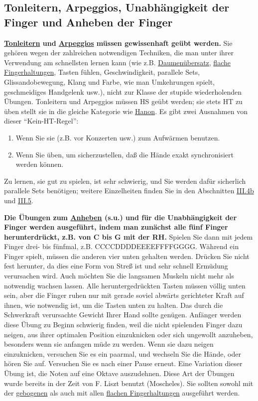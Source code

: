 
\subsection{Tonleitern, Arpeggios, Unabhängigkeit der Finger und Anheben der Finger}\hypertarget{c1iii7d}{}

\textbf{\hyperlink{c1iii5a}{Tonleitern} und \hyperlink{Arpeggios}{Arpeggios} müssen gewissenhaft geübt werden.}
Sie gehören wegen der zahlreichen notwendigen Techniken, die man unter ihrer Verwendung am schnellsten lernen kann (wie z.B. \hyperlink{c1iii5a}{Daumenübersatz}, \hyperlink{c1iii4b}{flache Fingerhaltungen}, Tasten fühlen, Geschwindigkeit, parallele Sets, Glissandobewegung, Klang und Farbe, wie man Umkehrungen spielt, geschmeidiges Handgelenk usw.), nicht zur Klasse der stupide wiederholenden Übungen.
Tonleitern und Arpeggios müssen HS geübt werden; sie stets HT zu üben stellt sie in die gleiche Kategorie wie \hyperlink{c1iii7h}{Hanon}.
Es gibt zwei Ausnahmen von dieser \enquote{Kein-HT-Regel}:

\begin{enumerate} 
 \item Wenn Sie sie (z.B. vor Konzerten usw.) zum Aufwärmen benutzen.
 \item Wenn Sie üben, um sicherzustellen, daß die Hände exakt synchronisiert werden können.
 \end{enumerate}
Zu lernen, sie gut zu spielen, ist sehr schwierig, und Sie werden dafür sicherlich parallele Sets benötigen; weitere Einzelheiten finden Sie in den Abschnitten \hyperlink{c1iii4b}{III.4b} und \hyperlink{c1iii5a}{III.5}.


\hypertarget{c1iii7finger}{}

\textbf{Die Übungen zum \hyperlink{c1iii7anheben}{Anheben} (s.u.) und für die Unabhängigkeit der Finger werden ausgeführt, indem man zunächst alle fünf Finger herunterdrückt, z.B. von C bis G mit der RH.}
Spielen Sie dann mit jedem Finger drei- bis fünfmal, z.B. CCCCDDDDEEEEFFFFGGGG.
Während ein Finger spielt, müssen die anderen vier unten gehalten werden.
Drücken Sie nicht fest herunter, da dies eine Form von Streß ist und sehr schnell Ermüdung verursachen wird.
Auch möchten Sie die langsamen Muskeln nicht mehr als notwendig wachsen lassen.
Alle heruntergedrückten Tasten müssen völlig unten sein, aber die Finger ruhen nur mit gerade soviel abwärts gerichteter Kraft auf ihnen, wie notwendig ist, um die Tasten unten zu halten.
Das durch die Schwerkraft verursachte Gewicht Ihrer Hand sollte genügen.
Anfänger werden diese Übung zu Beginn schwierig finden, weil die nicht spielenden Finger dazu neigen, aus ihrer optimalen Position einzuknicken oder sich ungewollt anzuheben, besonders wenn sie anfangen müde zu werden.
Wenn sie dazu neigen einzuknicken, versuchen Sie es ein paarmal, und wechseln Sie die Hände, oder hören Sie auf.
Versuchen Sie es nach einer Pause erneut.
Eine Variation dieser Übung ist, die Noten auf eine Oktave auszudehnen.
Diese Art der Übungen wurde bereits in der Zeit von F. Liszt benutzt (Moscheles).
Sie sollten sowohl mit der \hyperlink{c1ii2}{gebogenen} als auch mit allen \hyperlink{c1iii4b}{flachen Fingerhaltungen} ausgeführt werden.

